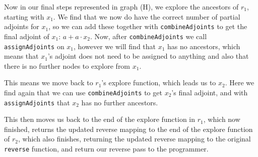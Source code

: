         Now in our final steps represented in graph (H), we explore the ancestors of $r_1$, starting with $x_1$.
        We find that we now do have the correct number of partial adjoints for $x_1$, so we can add these together with \texttt{combineAdjoints} to get the final adjoint of $x_1$: $a+a\cdot x_2$.
        Now, after \texttt{combineAdjoints} we call \texttt{assignAdjoints} on $x_1$, however we will find that $x_1$ has no ancestors, which means that $x_1$'s adjoint does not need to be assigned to anything and also that there is no further nodes to explore from $x_1$.

        This means we move back to $r_1$'s explore function, which leads us to $x_2$.
        Here we find again that we can use \texttt{combineAdjoints} to get $x_2$'s final adjoint, and with\\\texttt{assignAdjoints} that $x_2$ has no further ancestors.

        This then moves us back to the end of the explore function in $r_1$, which now finished, returns the updated reverse mapping to the end of the explore function of $r_2$, which also finishes, returning the updated reverse mapping to the original \texttt{reverse} function, and return our reverse pass to the programmer.
        
        \begin{figure}[p]
        \end{figure}

